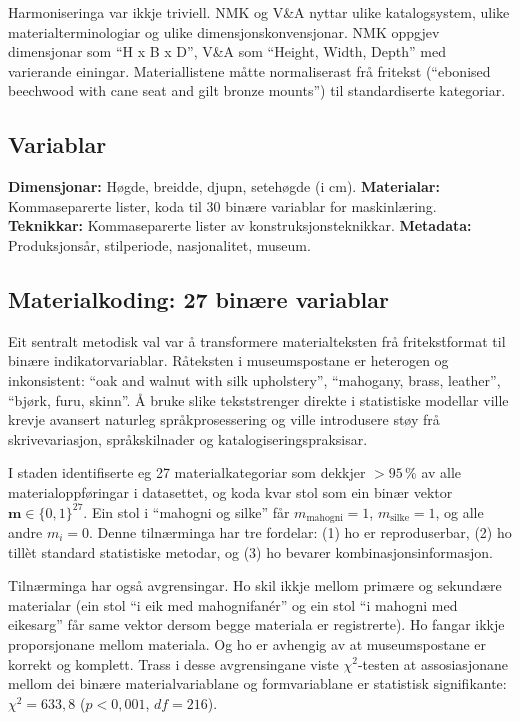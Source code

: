 \documentclass[12pt, a4paper]{article}
\begin{document}
Harmoniseringa var ikkje triviell. NMK og V\&A nyttar ulike katalogsystem, ulike materialterminologiar og ulike dimensjonskonvensjonar. NMK oppgjev dimensjonar som ``H x B x D'', V\&A som ``Height, Width, Depth'' med varierande einingar. Materiallistene måtte normaliserast frå fritekst (``ebonised beechwood with cane seat and gilt bronze mounts'') til standardiserte kategoriar.

\subsection{Variablar}

\textbf{Dimensjonar:} Høgde, breidde, djupn, setehøgde (i cm). \textbf{Materialar:} Kommaseparerte lister, koda til 30 binære variablar for maskinlæring. \textbf{Teknikkar:} Kommaseparerte lister av konstruksjonsteknikkar. \textbf{Metadata:} Produksjonsår, stilperiode, nasjonalitet, museum.

\subsection{Materialkoding: 27 binære variablar}

Eit sentralt metodisk val var å transformere materialteksten frå fritekstformat til binære indikatorvariablar. Råteksten i museumspostane er heterogen og inkonsistent: ``oak and walnut with silk upholstery'', ``mahogany, brass, leather'', ``bjørk, furu, skinn''. Å bruke slike tekststrenger direkte i statistiske modellar ville krevje avansert naturleg språkprosessering og ville introdusere støy frå skrivevariasjon, språkskilnader og katalogiseringspraksisar.

I staden identifiserte eg 27 materialkategoriar som dekkjer $> 95\,\%$ av alle materialoppføringar i datasettet, og koda kvar stol som ein binær vektor $\mathbf{m} \in \{0, 1\}^{27}$. Ein stol i ``mahogni og silke'' får $m_{\text{mahogni}} = 1$, $m_{\text{silke}} = 1$, og alle andre $m_i = 0$. Denne tilnærminga har tre fordelar: (1) ho er reproduserbar, (2) ho tillèt standard statistiske metodar, og (3) ho bevarer kombinasjonsinformasjon.

Tilnærminga har også avgrensingar. Ho skil ikkje mellom primære og sekundære materialar (ein stol ``i eik med mahognifanér'' og ein stol ``i mahogni med eikesarg'' får same vektor dersom begge materiala er registrerte). Ho fangar ikkje proporsjonane mellom materiala. Og ho er avhengig av at museumspostane er korrekt og komplett. Trass i desse avgrensingane viste $\chi^2$-testen at assosiasjonane mellom dei binære materialvariablane og formvariablane er statistisk signifikante: $\chi^2 = 633{,}8$ ($p < 0{,}001$, $df = 216$).
\end{document}
